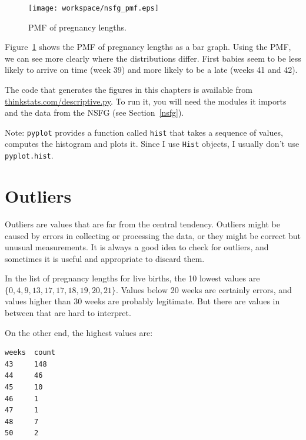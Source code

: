 \documentclass[12pt]{book}
\begin{document}
\begin{figure}
\centerline{\texttt{[image: workspace/nsfg\_pmf.eps]}}
\caption{PMF of pregnancy lengths.}
\label{nsfg_pmf}
\end{figure}


Figure~\ref{nsfg_pmf} shows the PMF of pregnancy lengths as a bar
graph.  Using the PMF, we can see more clearly where the distributions
differ.  First babies seem to be less likely to arrive on time (week
39) and more likely to be a late (weeks 41 and 42).

The code that generates the figures in this chapters is available from
\url{thinkstats.com/descriptive.py}.  To run it, you will need the
modules it imports and the data from the NSFG (see
Section~\ref{nsfg}).


Note: {\tt pyplot} provides a function called {\tt hist} that
takes a sequence of values, computes the histogram and plots it.
Since I use {\tt Hist} objects, I usually don't use {\tt pyplot.hist}.


\section{Outliers}

Outliers are values that are far from the central tendency.  Outliers
might be caused by errors in collecting or processing the data, or
they might be correct but unusual measurements.  It is always a good
idea to check for outliers, and sometimes it is useful and appropriate
to discard them.


In the list of pregnancy lengths for live births, the 10 lowest values
are $\{ 0, 4, 9, 13, 17, 17, 18, 19, 20, 21 \}$.  Values below 20
weeks are certainly errors, and values higher than 30 weeks are
probably legitimate.  But there are values in between that are
hard to interpret.


On the other end, the highest values are:

\begin{verbatim}
weeks  count
43     148
44     46
45     10
46     1
47     1
48     7
50     2
\end{verbatim}
\end{document}
